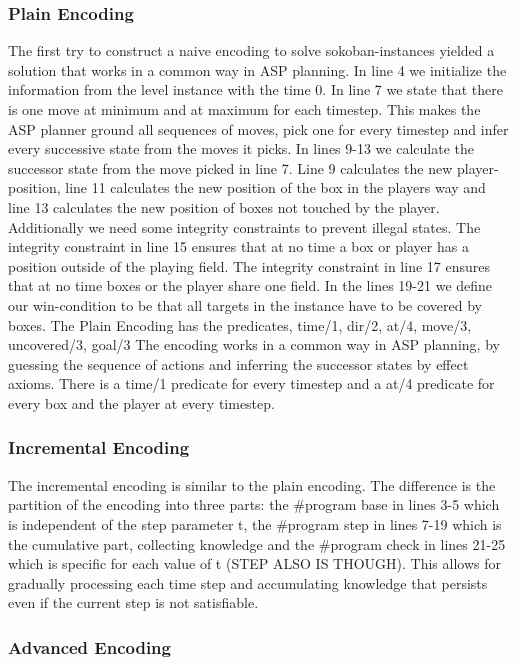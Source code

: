 \documentclass{article}
\begin{document}
\subsubsection{Plain Encoding}

The first try to construct a naive encoding to solve sokoban-instances yielded a solution that works in a common way in ASP planning. In line 4 we initialize the information from the level instance with the time 0. In line 7 we state that there is one move at minimum and at maximum for each timestep. This makes the ASP planner ground all sequences of moves, pick one for every timestep and infer every successive state from the moves it picks. In lines 9-13 we calculate the successor state from the move picked in line 7. Line 9 calculates the new player-position, line 11 calculates the new position of the box in the players way and line 13 calculates the new position of boxes not touched by the player. Additionally we need some integrity constraints to prevent illegal states. The integrity constraint in line 15 ensures that at no time a box or player has a position outside of the playing field. The integrity constraint in line 17 ensures that at no time boxes or the player share one field.
In the lines 19-21 we define our win-condition to be that all targets in the instance have to be covered by boxes.
The Plain Encoding has the predicates, time/1, dir/2, at/4, move/3, uncovered/3, goal/3
The encoding works in a common way in ASP planning, by guessing the sequence of actions and inferring the successor states by effect axioms. There is a time/1 predicate for every timestep and a at/4 predicate for every box and the player at every timestep.

\subsubsection{Incremental Encoding}

The incremental encoding is similar to the plain encoding. The difference is the partition of the encoding into three parts: the \#program base in lines 3-5 which is independent of the step parameter t, the \#program step in lines 7-19 which is the cumulative part, collecting knowledge and the \#program check in lines 21-25 which is specific for each value of t (STEP ALSO IS THOUGH). This allows for gradually processing each time step and accumulating knowledge that persists even if the current step is not satisfiable.

\subsubsection{Advanced Encoding}

\end{document}
